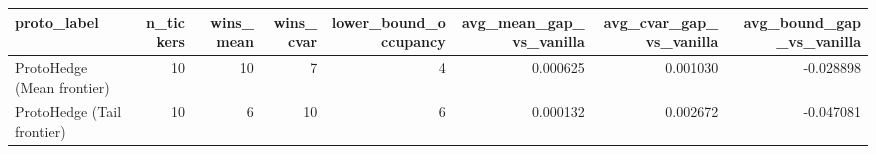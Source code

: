 \begin{tabular}{lrrrrrrr}
\toprule
proto_label & n_tickers & wins_mean & wins_cvar & lower_bound_occupancy & avg_mean_gap_vs_vanilla & avg_cvar_gap_vs_vanilla & avg_bound_gap_vs_vanilla \\
\midrule
ProtoHedge (Mean frontier) & 10 & 10 & 7 & 4 & 0.000625 & 0.001030 & -0.028898 \\
ProtoHedge (Tail frontier) & 10 & 6 & 10 & 6 & 0.000132 & 0.002672 & -0.047081 \\
\bottomrule
\end{tabular}
